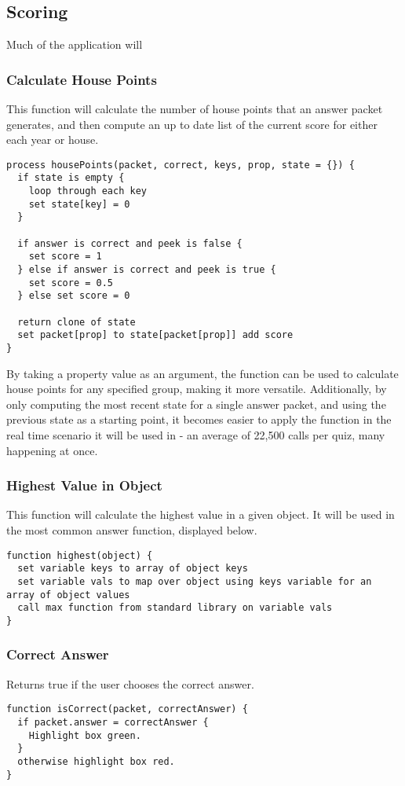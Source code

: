 \subsection{Scoring}
Much of the application will

\subsubsection{Calculate House Points}
This function will calculate the number of house points that an answer packet generates, and then compute an up to date list of the current score for either each year or house.
\begin{verbatim}
process housePoints(packet, correct, keys, prop, state = {}) {
  if state is empty {
    loop through each key
    set state[key] = 0
  }

  if answer is correct and peek is false {
    set score = 1
  } else if answer is correct and peek is true {
    set score = 0.5
  } else set score = 0

  return clone of state
  set packet[prop] to state[packet[prop]] add score
}
\end{verbatim}
By taking a property value as an argument, the function can be used to calculate house points for any specified group, making it more versatile. Additionally, by only computing the most recent state for a single answer packet, and using the previous state as a starting point, it becomes easier to apply the function in the real time scenario it will be used in - an average of 22,500 calls per quiz, many happening at once.

\subsubsection{Highest Value in Object}
This function will calculate the highest value in a given object. It will be used in the most common answer function, displayed below.
\begin{verbatim}
function highest(object) {
  set variable keys to array of object keys
  set variable vals to map over object using keys variable for an array of object values
  call max function from standard library on variable vals
}
\end{verbatim}

\subsubsection{Correct Answer}
Returns true if the user chooses the correct answer.
\begin{verbatim}
function isCorrect(packet, correctAnswer) {
  if packet.answer = correctAnswer {
    Highlight box green.
  }
  otherwise highlight box red.
}
\end{verbatim}

